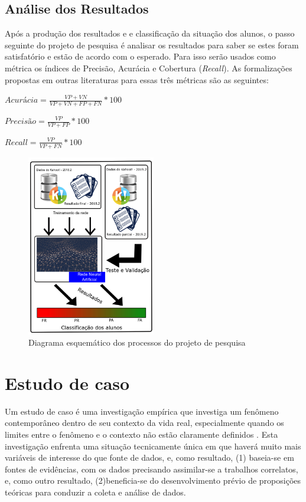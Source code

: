 \subsection{Análise dos Resultados}
\label{ss:analise}
Após a produção dos resultados e e classificação da situação dos alunos, o passo seguinte do projeto de pesquisa é analisar os resultados para saber se estes foram satisfatório e estão de acordo com o esperado. Para isso serão usados como métrica os índices de Precisão, Acurácia e Cobertura (\textit{Recall}). As formalizações propostas em outras literaturas para essas três métricas são as seguintes:


$Acurácia = \frac{VP+VN}{VP+VN+FP+FN}*100$

$Precisão = \frac{VP}{VP+FP}*100$

$\textit{Recall} = \frac{VP}{VP+FN}*100$

\begin{figure}
    \centering
    \includegraphics[width=0.5\textwidth]{modelo-monografia-rej-2018/img/ProcessoMetodologico.png}
    \caption{Diagrama esquemático dos processos do projeto de pesquisa}
    \label{fig:processo}
\end{figure}


\section{Estudo de caso}
\label{sec:estudo}
Um estudo de caso é uma investigação empírica que investiga um fenômeno contemporâneo dentro de seu contexto da vida real, especialmente quando os limites entre o fenômeno e o contexto não estão claramente definidos \cite{yin2001planejamento}. Esta investigação enfrenta uma situação tecnicamente única em que haverá muito mais variáveis de interesse do que fonte de dados, e, como resultado, (1) baseia-se em fontes de evidências, com os dados precisando assimilar-se a trabalhos correlatos, e, como outro resultado, (2)beneficia-se do desenvolvimento prévio de proposições teóricas para conduzir a coleta e análise de dados.

